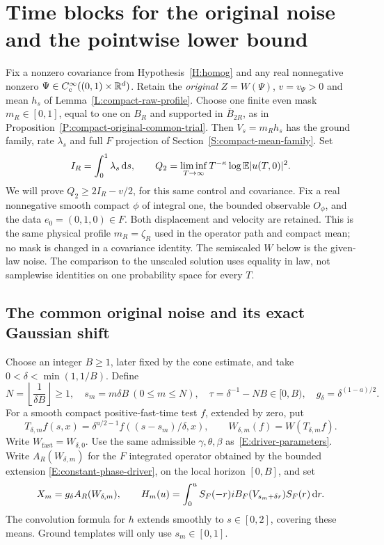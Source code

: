 \section{Time blocks for the original noise and the pointwise lower bound}
\label{S:actual-raw-block-lower}

Fix a nonzero covariance from Hypothesis~\ref{H:homog} and any real nonnegative
nonzero $\Psi \in C_c^\infty((0,1)\times\mathbb{R}^d)$. Retain the \emph{original} $Z =
W(\Psi)$, $v = v_\Psi > 0$ and mean $h_s$ of Lemma~\ref{L:compact-raw-profile}.
Choose one finite even mask $m_R \in [0,1]$, equal to one on $B_R$ and supported
in $\overline{B}_{2R}$, as in Proposition~\ref{P:compact-original-common-trial}.
Then $V_s = m_Rh_s$ has the ground family, rate $\lambda_s$ and full $F$
projection of Section~\ref{S:compact-mean-family}. Set
\[
  I_R=\int_0^1\lambda_s\,\mathrm{d} s,\qquad
  Q_2=\liminf_{T\to\infty}T^{-\kappa}\log\mathbb{E}|u(T,0)|^2.
\]
We will prove $Q_2 \ge 2I_R-v/2$, for this same control and covariance. Fix a
real nonnegative smooth compact $\phi$ of integral one, the bounded observable
$O_\phi$, and the data $e_0 = (0,1,0) \in F$. Both displacement and velocity are
retained. This is the same physical profile $m_R = \zeta_R$ used in the operator
path and compact mean; no mask is changed in a covariance identity. The
semiscaled $W$ below is the given-law noise. The comparison to the unscaled
solution uses equality in law, not samplewise identities on one probability
space for every $T$.

\subsection{The common original noise and its exact Gaussian shift}

Choose an integer $B \ge 1$, later fixed by the cone estimate, and take $0 <
\delta < \min(1,1/B)$. Define
\begin{equation}\label{E:raw-block-clocks}
  N=\left\lfloor\frac1{\delta B}\right\rfloor\ge1,\quad
  s_m=m\delta B\ (0\le m\le N),\quad
  \tau=\delta^{-1}-NB\in[0,B),\quad
  g_\delta=\delta^{(1-a)/2}.
\end{equation}
For a smooth compact positive-fast-time test $f$, extended by zero, put
\begin{equation}\label{E:raw-block-pullback}
  T_{\delta,m}f(s,x)
  =\delta^{a/2-1}f((s-s_m)/\delta,x),\qquad
  W_{\delta,m}(f)=W(T_{\delta,m}f).
\end{equation}
Write $W_{\mathrm{fast}} = W_{\delta,0}$. Use the same admissible
$\gamma,\theta,\beta$ as~\eqref{E:driver-parameters}. Write $A_R(W_{\delta,m})$
for the $F$ integrated operator obtained by the bounded extension
\eqref{E:constant-phase-driver}, on the local horizon $[0,B]$, and set
\begin{equation}\label{E:raw-block-drivers}
  X_m=g_\delta A_R(W_{\delta,m}),\qquad
  H_m(u)=\int_0^uS_F(-r)iB_F(V_{s_m+\delta r})S_F(r)\,\mathrm{d} r.
\end{equation}
The convolution formula for $h$ extends smoothly to $s \in [0,2]$, covering
these means. Ground templates will only use $s_m \in [0,1]$.

